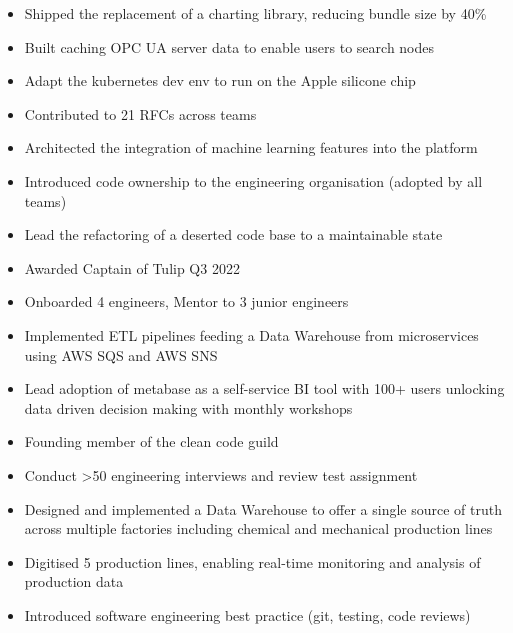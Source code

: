 \documentclass[10pt,a4paper,ragged2e,withhyper]{altacv}
\begin{document}
\begin{paracol}{2}

\begin{itemize}
\item Shipped the replacement of a charting library, reducing bundle size by 40\%
\item Built caching OPC UA server data to enable users to search nodes
\item Adapt the kubernetes dev env to run on the Apple silicone chip

\item Contributed to 21 RFCs across teams
\item Architected the integration of machine learning features into the platform
\item Introduced code ownership to the engineering organisation (adopted by all teams)
\item Lead the refactoring of a deserted code base to a maintainable state

\item Awarded Captain of Tulip Q3 2022
\item Onboarded 4 engineers, Mentor to 3 junior engineers
\end{itemize}

\divider

\begin{itemize}
\item Implemented ETL pipelines feeding a Data Warehouse from microservices using AWS SQS and AWS SNS
\item Lead adoption of metabase as a self-service BI tool with 100+ users unlocking data driven decision making with monthly workshops
\item Founding member of the clean code guild
\item Conduct >50 engineering interviews and review test assignment
\end{itemize}

\divider

\begin{itemize}
\item Designed and implemented a Data Warehouse to offer a single source of truth across multiple factories including chemical and mechanical production lines
\item Digitised 5 production lines, enabling real-time monitoring and analysis of production data
\item Introduced software engineering best practice (git, testing, code reviews)
\end{itemize}


\end{paracol}
\end{document}
